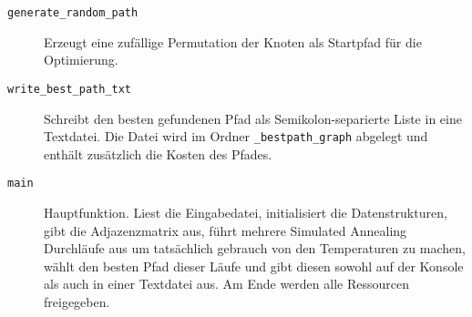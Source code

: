 \documentclass{article}
\begin{document}
\begin{description}
    \item[\texttt{generate\_random\_path}] Erzeugt eine zufällige Permutation der Knoten als Startpfad für die Optimierung.
    \item[\texttt{write\_best\_path\_txt}] Schreibt den besten gefundenen Pfad als Semikolon-separierte Liste in eine Textdatei. Die Datei wird im Ordner \texttt{\_bestpath\_graph} abgelegt und enthält zusätzlich die Kosten des Pfades.
    \item[\texttt{main}] Hauptfunktion. Liest die Eingabedatei, initialisiert die Datenstrukturen, gibt die Adjazenzmatrix aus, führt mehrere Simulated Annealing Durchläufe aus um tatsächlich gebrauch von den Temperaturen zu machen, wählt den besten Pfad dieser Läufe und gibt diesen sowohl auf der Konsole als auch in einer Textdatei aus. Am Ende werden alle Ressourcen freigegeben.
\end{description}
\end{document}
